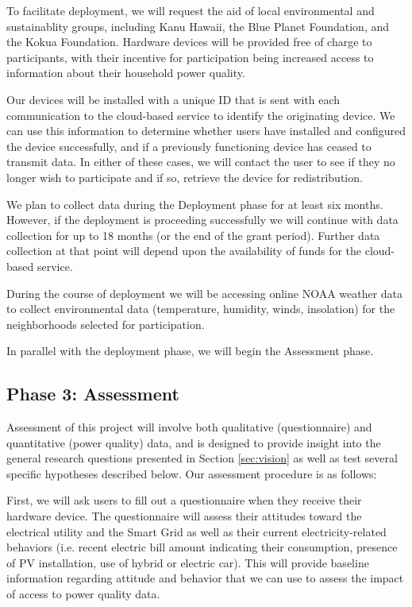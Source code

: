 \documentclass[11pt]{article}
\begin{document}
To facilitate deployment, we will request the aid of local environmental and sustainablity groups, including Kanu Hawaii, the Blue Planet Foundation, and the Kokua Foundation.  Hardware devices will be provided free of charge to participants, with their incentive for participation being increased access to information about their household power quality.  

Our devices will be installed with a unique ID that is sent with each communication to the cloud-based service to identify the originating device.  We can use this information to determine whether users have installed and configured the device successfully, and if a previously functioning device has ceased to transmit data.   In either of these cases, we will contact the user to see if they no longer wish to participate and if so, retrieve the device for redistribution. 

We plan to collect data during the Deployment phase for at least six months. However, if the deployment is proceeding successfully we will continue with data collection for up to 18 months (or the end of the grant period).  Further data collection at that point will depend upon the availability of funds for the cloud-based service.

During the course of deployment we will be accessing online NOAA weather data to collect environmental data (temperature, humidity, winds, insolation) for the neighborhoods selected for participation. 

In parallel with the deployment phase, we will begin the Assessment phase. 

\subsection{Phase 3: Assessment}

Assessment of this project will involve both qualitative (questionnaire) and quantitative (power quality) data, and is designed to provide insight into the general research questions presented in Section \ref{sec:vision} as well as test several specific hypotheses described below. Our assessment procedure is as follows:

First, we will ask users to fill out a questionnaire when they receive their hardware device.  The questionnaire will assess their attitudes toward the electrical utility and the Smart Grid as well as their current electricity-related behaviors (i.e. recent electric bill amount indicating their consumption, presence of PV installation, use of hybrid or electric car). This will provide baseline information regarding attitude and behavior that we can use to assess the impact of access to power quality data.
\end{document}
